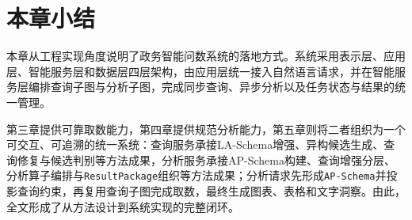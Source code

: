 \section{本章小结}

本章从工程实现角度说明了政务智能问数系统的落地方式。系统采用表示层、应用层、智能服务层和数据层四层架构，由应用层统一接入自然语言请求，并在智能服务层编排查询子图与分析子图，完成同步查询、异步分析以及任务状态与结果的统一管理。

第三章提供可靠取数能力，第四章提供规范分析能力，第五章则将二者组织为一个可交互、可追溯的统一系统：查询服务承接LA-Schema增强、异构候选生成、查询修复与候选判别等方法成果，分析服务承接AP-Schema构建、查询增强分层、分析算子编排与\texttt{ResultPackage}组织等方法成果；分析请求先形成\texttt{AP-Schema}并投影查询约束，再复用查询子图完成取数，最终生成图表、表格和文字洞察。由此，全文形成了从方法设计到系统实现的完整闭环。
